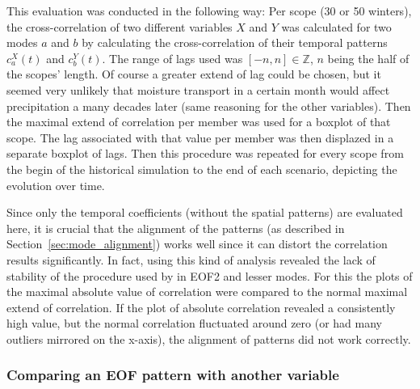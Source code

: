 This evaluation was conducted in the following way: 
Per scope (30 or 50 winters), the cross-correlation of two different variables $X$ and $Y$ was calculated for two modes $a$ and $b$ by calculating the cross-correlation of their temporal patterns $c_a^X(t)$ and $c_b^Y(t)$. 
The range of lags used was $[-n,n] \in \mathbb{Z}$, $n$ being the half of the scopes' length. 
Of course a greater extend of lag could be chosen, but it seemed very unlikely that moisture transport in a certain month would affect precipitation a many decades later (same reasoning for the other variables).
Then the maximal extend of correlation per member was used for a boxplot of that scope.
The lag associated with that value per member was then displazed in a separate boxplot of lags. 
Then this procedure was repeated for every scope from the begin of the historical simulation to the end of each scenario, depicting the evolution over time. 

Since only the temporal coefficients (without the spatial patterns) are evaluated here, it is crucial that the alignment of the patterns (as described in Section~\ref{sec:mode_alignment}) works well since it can distort the correlation results significantly. 
In fact, using this kind of analysis revealed the lack of stability of the procedure used by  in EOF2 and lesser modes. 
For this the plots of the maximal absolute value of correlation were compared to the normal maximal extend of correlation. 
If the plot of absolute correlation revealed a consistently high value, but the normal correlation fluctuated around zero (or had many outliers mirrored on the x-axis), the alignment of patterns did not work correctly. 


\subsubsection{Comparing an EOF pattern with another variable}

